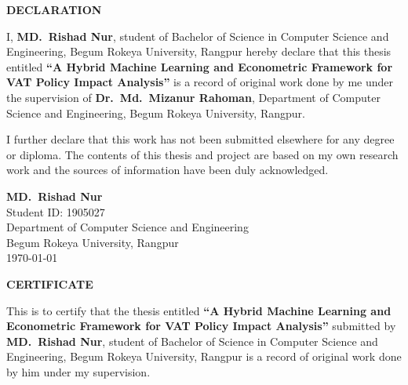 \newpage
\thispagestyle{empty}
\vspace*{4cm}

\begin{center}
    {\Large\bfseries DECLARATION}
\end{center}

\vspace{1cm}

I, \textbf{MD.\ Rishad Nur}, student of Bachelor of Science in Computer Science and Engineering, Begum Rokeya University, Rangpur hereby declare that this thesis entitled \textbf{``A Hybrid Machine Learning and Econometric Framework for VAT Policy Impact Analysis''} is a record of original work done by me under the supervision of \textbf{Dr.\ Md.\ Mizanur Rahoman}, Department of Computer Science and Engineering, Begum Rokeya University, Rangpur.

\vspace{1cm}

I further declare that this work has not been submitted elsewhere for any degree or diploma. The contents of this thesis and project are based on my own research work and the sources of information have been duly acknowledged.

\vspace{3cm}

\begin{flushright}
    \textbf{MD.\ Rishad Nur}\\
    Student ID: 1905027\\
    Department of Computer Science and Engineering\\
    Begum Rokeya University, Rangpur\\
    \today
\end{flushright}

\newpage
\thispagestyle{empty}
\vspace*{2cm}

\begin{center}
    {\Large\bfseries CERTIFICATE}
\end{center}

\vspace{1cm}

This is to certify that the thesis entitled \textbf{``A Hybrid Machine Learning and Econometric Framework for VAT Policy Impact Analysis''} submitted by \textbf{MD.\ Rishad Nur}, student of Bachelor of Science in Computer Science and Engineering, Begum Rokeya University, Rangpur is a record of original work done by him under my supervision.

